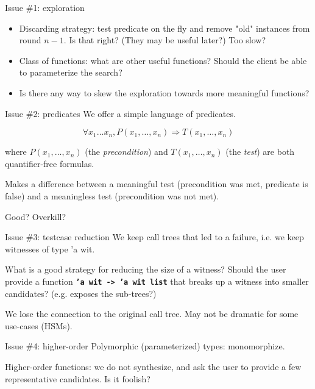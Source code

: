 \documentclass[final,xetex]{beamer}
\newcommand{\green}[1]{{\color{chameleon3}#1}}
\newcommand{\code}[1]{\texttt{\textbf{#1}}}
\begin{document}
\begin{frame}[fragile]{Issue \#1: exploration}
  \begin{itemize}
    \item \green{Discarding strategy}: test predicate on the fly and remove
      "old" instances from round $n - 1$. Is that right? (They may be useful
      later?) Too slow?
    \item \green{Class of functions}: what are other useful functions? Should
      the client be able to parameterize the search?
    \item Is there any way to skew the exploration towards more meaningful
      functions?
  \end{itemize}
\end{frame}

\begin{frame}[fragile]{Issue \#2: predicates}
  We offer a simple language of predicates.

  \[
\forall x_1 \dots x_n, P(x_1, \dots, x_n) \Rightarrow T(x_1, \dots,
x_n) \]

where $P(x_1, \dots, x_n)$ (the \emph{precondition}) and
$T(x_1, \dots, x_n)$ (the \emph{test}) are both quantifier-free
formulas.

\bigskip

Makes a difference between a \green{meaningful} test (precondition was met,
predicate is false) and a \green{meaningless test} (precondition was not met).

\bigskip

Good? Overkill?
\end{frame}

\begin{frame}{Issue \#3: testcase reduction}
  We keep call trees that led to a failure, i.e. we keep \green{witnesses} of
  type \green{'a wit}.

  \bigskip

  What is a good strategy for reducing the size of a witness? Should the user
  provide a function \code{'a wit -> 'a wit list} that breaks up a witness into
  smaller candidates? (e.g. exposes the sub-trees?)

  \bigskip

  We lose the connection to the original call tree. May not be dramatic for some
  use-cases (HSMs).
\end{frame}

\begin{frame}{Issue \#4: higher-order}
  Polymorphic (parameterized) types: monomorphize.

  \bigskip

  Higher-order functions: we do not synthesize, and ask the user to provide a
  few representative candidates. Is it foolish?
\end{frame}
\end{document}
